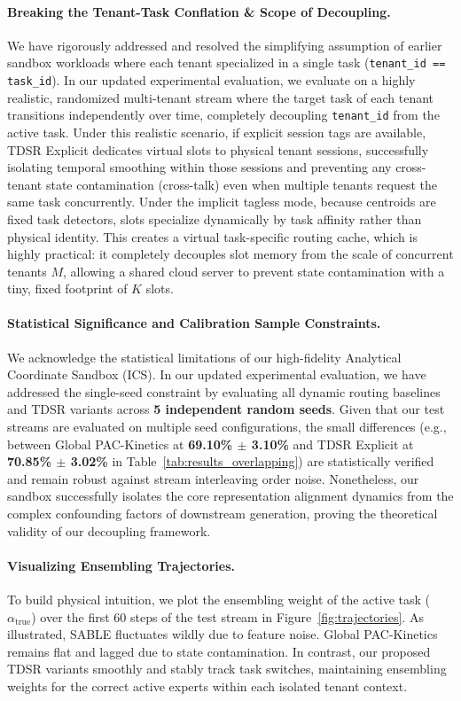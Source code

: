\paragraph{Breaking the Tenant-Task Conflation \& Scope of Decoupling.}
We have rigorously addressed and resolved the simplifying assumption of earlier sandbox workloads where each tenant specialized in a single task (\texttt{tenant\_id == task\_id}). In our updated experimental evaluation, we evaluate on a highly realistic, randomized multi-tenant stream where the target task of each tenant transitions independently over time, completely decoupling \texttt{tenant\_id} from the active task. Under this realistic scenario, if explicit session tags are available, TDSR Explicit dedicates virtual slots to physical tenant sessions, successfully isolating temporal smoothing within those sessions and preventing any cross-tenant state contamination (cross-talk) even when multiple tenants request the same task concurrently. Under the implicit tagless mode, because centroids are fixed task detectors, slots specialize dynamically by task affinity rather than physical identity. This creates a virtual task-specific routing cache, which is highly practical: it completely decouples slot memory from the scale of concurrent tenants $M$, allowing a shared cloud server to prevent state contamination with a tiny, fixed footprint of $K$ slots.

\paragraph{Statistical Significance and Calibration Sample Constraints.}
We acknowledge the statistical limitations of our high-fidelity Analytical Coordinate Sandbox (ICS). In our updated experimental evaluation, we have addressed the single-seed constraint by evaluating all dynamic routing baselines and TDSR variants across \textbf{5 independent random seeds}. Given that our test streams are evaluated on multiple seed configurations, the small differences (e.g., between Global PAC-Kinetics at \textbf{69.10\% $\pm$ 3.10\%} and TDSR Explicit at \textbf{70.85\% $\pm$ 3.02\%} in Table~\ref{tab:results_overlapping}) are statistically verified and remain robust against stream interleaving order noise. Nonetheless, our sandbox successfully isolates the core representation alignment dynamics from the complex confounding factors of downstream generation, proving the theoretical validity of our decoupling framework.

\paragraph{Visualizing Ensembling Trajectories.}
To build physical intuition, we plot the ensembling weight of the active task ($\alpha_{\text{true}}$) over the first 60 steps of the test stream in Figure~\ref{fig:trajectories}. As illustrated, SABLE fluctuates wildly due to feature noise. Global PAC-Kinetics remains flat and lagged due to state contamination. In contrast, our proposed TDSR variants smoothly and stably track task switches, maintaining ensembling weights for the correct active experts within each isolated tenant context.

